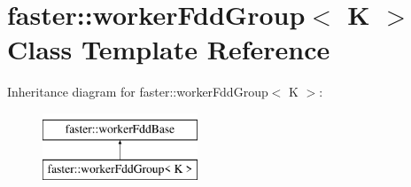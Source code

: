 \hypertarget{classfaster_1_1workerFddGroup}{}\section{faster\+:\+:worker\+Fdd\+Group$<$ K $>$ Class Template Reference}
\label{classfaster_1_1workerFddGroup}
Inheritance diagram for faster\+:\+:worker\+Fdd\+Group$<$ K $>$\+:\begin{figure}[H]
\begin{center}
\leavevmode
\includegraphics[height=2.000000cm]{classfaster_1_1workerFddGroup}
\end{center}
\end{figure}
